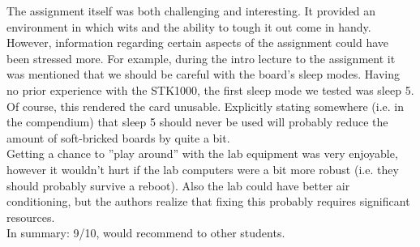 The assignment itself was both challenging and interesting.
It provided an environment in which wits and the ability to tough it out come in handy.
However, information regarding certain aspects of the assignment could have been stressed more.
For example, during the intro lecture to the assignment\cite{lab-intro-lecture} it was mentioned that we should be careful with the board's sleep modes.
Having no prior experience with the STK1000, the first sleep mode we tested was sleep 5.
Of course, this rendered the card unusable.
Explicitly stating somewhere (i.e. in the compendium) that sleep 5 should never be used will probably reduce the amount of soft-bricked boards by quite a bit.
\\
Getting a chance to ''play around'' with the lab equipment was very enjoyable, however it wouldn't hurt if the lab computers were a bit more robust (i.e. they should probably survive a reboot).
Also the lab could have better air conditioning, but the authors realize that fixing this probably requires significant resources.
\\
In summary: 9/10, would recommend to other students.
